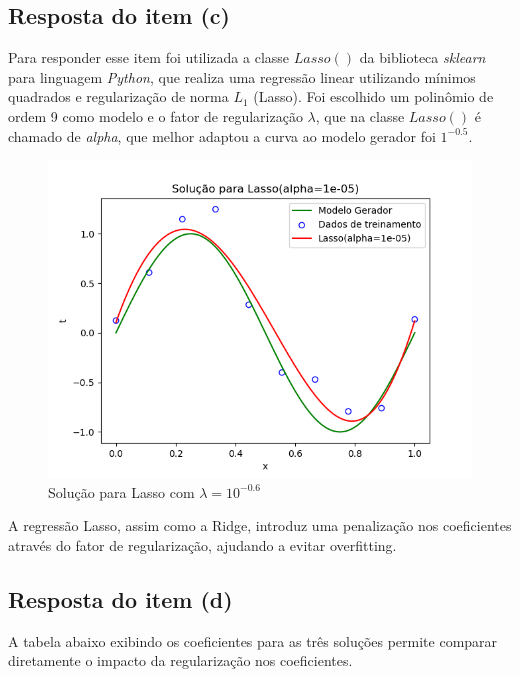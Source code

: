 \subsection{Resposta do item (c)}
Para responder esse item foi utilizada a classe $Lasso()$ da biblioteca \textit{sklearn} para linguagem \textit{Python}, que realiza uma regressão linear utilizando mínimos quadrados e regularização de norma $L_1$ (Lasso). Foi escolhido um polinômio de ordem 9 como modelo e o fator de regularização $\lambda$, que na classe $Lasso()$ é chamado de \textit{alpha}, que melhor adaptou a curva ao modelo gerador foi $1^{-0.5}$.
\begin{figure}[H]
    \centering
    \caption{Solução para Lasso com $\lambda = 10^{-0.6}$}
    \includegraphics[width=12cm]{E1_c.png}
\end{figure}
A regressão Lasso, assim como a Ridge, introduz uma penalização nos coeficientes através do fator de regularização, ajudando a evitar overfitting.

\subsection{Resposta do item (d)}

A tabela abaixo exibindo os coeficientes para as três soluções permite comparar diretamente o impacto da regularização nos coeficientes.

\begin{table}[H]
\caption{Coeficientes para $N=10$}
\end{table}

